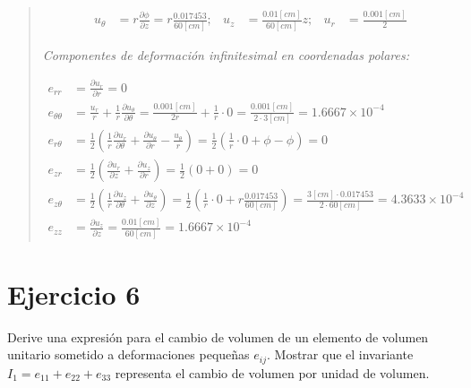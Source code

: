 \documentclass[a4paper,10pt,twoside,final,spanish]{article}
\begin{document}
\begin{quote}
\begin{align*}
u_{\theta} &= r\frac{\partial\phi}{\partial z}
=r\frac{0.017453}{60[cm]};
&
u_{z} &= \frac{0.01[cm]}{60[cm]}z;
&
u_{r} &= \frac{0.001[cm]}{2}
\end{align*}

\textit{Componentes de deformación infinitesimal en coordenadas polares:}

\begin{align*}
e_{rr} &= \frac{\partial u_{r}}{\partial r}=0                             \\
e_{\theta\theta}
&= \frac{u_{r}}{r}+\frac{1}{r}\frac{\partial u_{\theta}}{\partial \theta}
=\frac{0.001[cm]}{2r}+\frac{1}{r}\cdot 0=\frac{0.001[cm]}{2\cdot 3[cm]}
= 1.6667\times 10^{-4}                                                    \\
e_{r\theta}
&=\frac{1}{2}\left(\frac{1}{r}\frac{\partial u_{r}}{\partial\theta}
+\frac{\partial u_{\theta}}{\partial r}-\frac{u_{\theta}}{r}\right)
=\frac{1}{2}\left(\frac{1}{r}\cdot 0+\phi-\phi\right)=0                   \\
e_{zr} &= \frac{1}{2}\left(\frac{\partial u_{r}}{\partial z}
+\frac{\partial u_{z}}{\partial r}\right)
=\frac{1}{2}(0+0)=0                                                       \\
e_{z\theta} &= \frac{1}{2}\left(\frac{1}{r}
\frac{\partial u_{z}}{\partial\theta}
+\frac{\partial u_{\theta}}{\partial z}\right)
=\frac{1}{2}\left(\frac{1}{r}\cdot 0+r\frac{0.017453}{60[cm]}\right)
=\frac{3[cm]\cdot 0.017453}{2\cdot 60[cm]}=4.3633\times 10^{-4}           \\
e_{zz} &= \frac{\partial u_{z}}{\partial z}=\frac{0.01[cm]}{60[cm]}
=1.6667\times 10^{-4}
\end{align*}
\end{quote}

\section*{Ejercicio 6}

Derive una expresión para el cambio de volumen de un elemento de volumen unitario sometido a deformaciones pequeñas $e_{ij}$. Mostrar que el invariante
$I_{1}=e_{11}+e_{22}+e_{33}$ representa el cambio de volumen por unidad de volumen.

\dotfill
\end{document}
